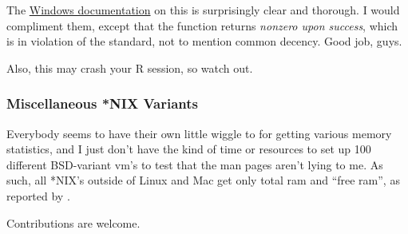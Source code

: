 The \href{http://msdn.microsoft.com/en-us/library/windows/desktop/aa366589%28v=vs.85%29.aspx}{Windows documentation} 
on this is surprisingly clear and thorough.  I would compliment them, except that the function returns \emph{nonzero upon success}, which is in violation of the  standard, not to mention common decency.  Good job, guys.

Also, this may crash your R session, so watch out.





\subsubsection{Miscellaneous *NIX Variants}

Everybody seems to have their own little wiggle to  for getting various memory statistics, and I just don't have the kind of time or resources to set up 100 different BSD-variant vm's to test that the man pages aren't lying to me.  As such, all *NIX's outside of Linux and Mac get only total ram and ``free ram'', as reported by .

Contributions are welcome.


